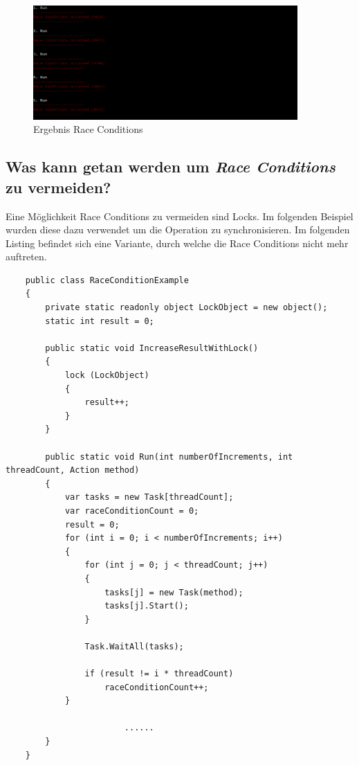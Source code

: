 \documentclass[a4paper,ngerman]{scrartcl}
\begin{document}
\begin{figure}[h]
	\centering
		\includegraphics[width=0.9\textwidth]{images/RaceConditionsExample.PNG}
	\caption{Ergebnis Race Conditions}
	\label{fig:RaceConditionsExample}
\end{figure}


\subsection{Was kann getan werden um \textit{Race Conditions} zu vermeiden?}

Eine Möglichkeit Race Conditions zu vermeiden sind Locks. Im folgenden Beispiel wurden diese dazu verwendet
um die Operation zu synchronisieren. Im folgenden Listing befindet sich eine Variante, durch welche die
Race Conditions nicht mehr auftreten.

\begin{lstlisting}
    public class RaceConditionExample
    {
        private static readonly object LockObject = new object();
        static int result = 0;

        public static void IncreaseResultWithLock()
        {
            lock (LockObject)
            {
                result++;
            }
        }

        public static void Run(int numberOfIncrements, int threadCount, Action method)
        {
            var tasks = new Task[threadCount];
            var raceConditionCount = 0;
            result = 0;
            for (int i = 0; i < numberOfIncrements; i++)
            {
                for (int j = 0; j < threadCount; j++)
                {
                    tasks[j] = new Task(method);
                    tasks[j].Start();
                }

                Task.WaitAll(tasks);

                if (result != i * threadCount)
                    raceConditionCount++;
            }
						
						......
        }
    }
\end{lstlisting}
\end{document}
